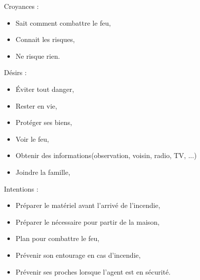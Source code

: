             Croyances :
            \begin{itemize}
                \item Sait comment combattre le feu,
                \item Connait les risques,
                \item Ne risque rien.
            \end{itemize}

            Désirs :
            \begin{itemize}
                \item Éviter tout danger,
                \item Rester en vie,
                \item Protéger ses biens,
                \item Voir le feu,
                \item Obtenir des informations(observation, voisin, radio, TV, ...)
                \item Joindre la famille,
            \end{itemize}

            Intentions :
            \begin{itemize}
                \item Préparer le matériel avant l'arrivé de l'incendie,
                \item Préparer le nécessaire pour partir de la maison,
                \item Plan pour combattre le feu,
                \item Prévenir son entourage en cas d'incendie,
                \item Prévenir ses proches lorsque l'agent est en sécurité.
            \end{itemize}
